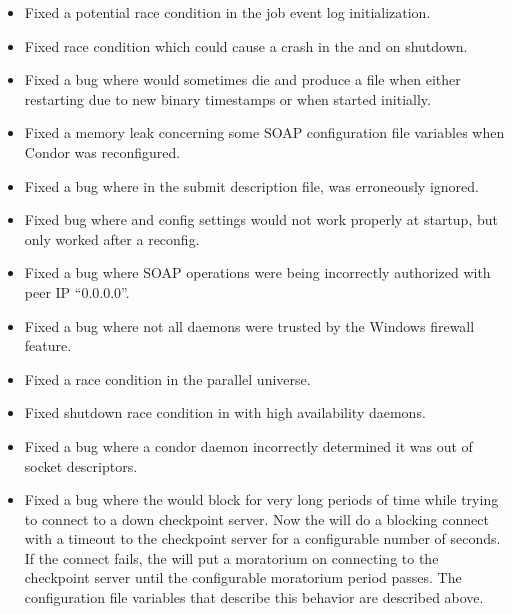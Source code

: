 \begin{itemize}
\item Fixed a potential race condition in the job event log initialization.

\item Fixed race condition which could cause a crash in the 
and  on shutdown.

\item Fixed a bug where  would sometimes die and produce
a  file when either restarting due to new
binary timestamps or when started initially.

\item Fixed a memory leak concerning some SOAP configuration file variables
when Condor was reconfigured.

\item Fixed a bug where in the submit description file,
 was erroneously ignored.

\item Fixed bug where  and
 config settings would not work
properly at startup, but only worked after a reconfig.

\item Fixed a bug where SOAP operations were being incorrectly authorized
with peer IP ``0.0.0.0''.

\item Fixed a bug where not all daemons were trusted by the Windows firewall
feature.

\item Fixed a race condition in the parallel universe.

\item Fixed shutdown race condition in  with
high availability daemons.

\item Fixed a bug where a condor daemon incorrectly determined it was
out of socket descriptors.

\item Fixed a bug where the  would block for very long
periods of time while trying to connect to a down checkpoint server. Now
the  will do a blocking connect with a timeout to the
checkpoint server for a configurable number of seconds. If the connect
fails, the  will put a moratorium on connecting to the
checkpoint server until the configurable moratorium period passes. The
configuration file variables that describe this behavior are described
above.


\end{itemize}
